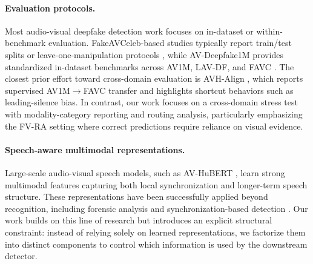 \documentclass{article}
\begin{document}
\paragraph{Evaluation protocols.}
Most audio-visual deepfake detection work focuses on in-dataset or within-benchmark evaluation. FakeAVCeleb-based studies typically report train/test splits or leave-one-manipulation protocols \citep{feng2023avad, oorloff2024avff}, while AV-Deepfake1M provides standardized in-dataset benchmarks across AV1M, LAV-DF, and FAVC \citep{cai2024avdeepfake1m}. 
The closest prior effort toward cross-domain evaluation is AVH-Align \citep{smeu2025avhalign}, which reports supervised AV1M$\rightarrow$FAVC transfer and highlights shortcut behaviors such as leading-silence bias. In contrast, our work focuses on a cross-domain stress test with modality-category reporting and routing analysis, particularly emphasizing the FV-RA setting where correct predictions require reliance on visual evidence.

\paragraph{Speech-aware multimodal representations.}
Large-scale audio-visual speech models, such as AV-HuBERT \citep{shi2022avhubert}, learn strong multimodal features capturing both local synchronization and longer-term speech structure. These representations have been successfully applied beyond recognition, including forensic analysis and synchronization-based detection \citep{liang2024speechforensics, smeu2025avhalign}. 
Our work builds on this line of research but introduces an explicit structural constraint: instead of relying solely on learned representations, we factorize them into distinct components to control which information is used by the downstream detector.
\end{document}
